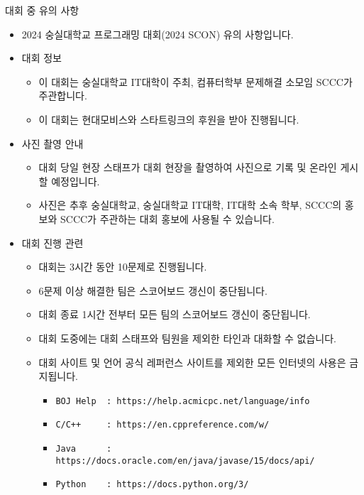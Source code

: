 {
    \indent
    \Large
    
    대회 중 유의 사항
}

\begin{itemize}[noitemsep]
    \item 2024 숭실대학교 프로그래밍 대회(2024 SCON) 유의 사항입니다.
    
    \item 대회 정보
    
    \begin{itemize}[noitemsep]
        \item 이 대회는 숭실대학교 IT대학이 주최, 컴퓨터학부 문제해결 소모임 SCCC가 주관합니다.
        \item 이 대회는 현대모비스와 스타트링크의 후원을 받아 진행됩니다.
    \end{itemize}
    
    \item 사진 촬영 안내
    
    \begin{itemize}[noitemsep]
        \item 대회 당일 현장 스태프가 대회 현장을 촬영하여 사진으로 기록 및 온라인 게시할 예정입니다.
        \item 사진은 추후 숭실대학교, 숭실대학교 IT대학, IT대학 소속 학부, SCCC의 홍보와 SCCC가 주관하는 대회 홍보에 사용될 수 있습니다.
    \end{itemize}

    \item 대회 진행 관련

    \begin{itemize}[noitemsep]
        \item 대회는 3시간 동안 10문제로 진행됩니다.
        \item 6문제 이상 해결한 팀은 스코어보드 갱신이 중단됩니다.
        \item 대회 종료 1시간 전부터 모든 팀의 스코어보드 갱신이 중단됩니다.
        \item 대회 도중에는 대회 스태프와 팀원을 제외한 타인과 대화할 수 없습니다.
        \item 대회 사이트 및 언어 공식 레퍼런스 사이트를 제외한 모든 인터넷의 사용은 금지됩니다.

        \begin{itemize}[noitemsep]
            \item \texttt{BOJ Help \ : https://help.acmicpc.net/language/info}
            \item \texttt{C/C++ \ \ \ \ : https://en.cppreference.com/w/}
            \item \texttt{Java \ \ \ \ \ : https://docs.oracle.com/en/java/javase/15/docs/api/}
            \item \texttt{Python \ \ \ : https://docs.python.org/3/}
        \end{itemize}


\end{itemize}
\end{itemize}
